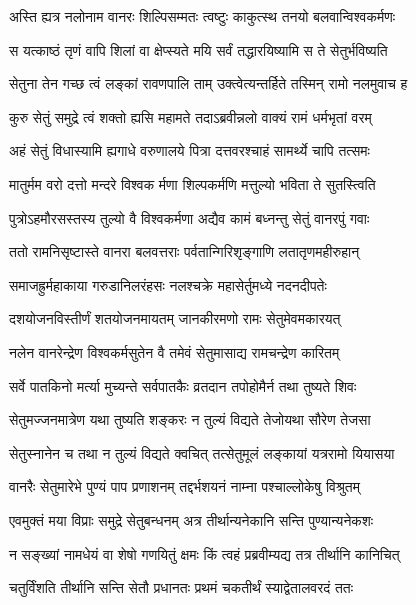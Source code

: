 \twolineshloka
{अस्ति ह्यत्र नलोनाम वानरः शिल्पिसम्मतः}
{त्वष्टुः काकुत्स्थ तनयो बलवान्विश्वकर्मणः}%

\twolineshloka
{स यत्काष्ठं तृणं वापि शिलां वा क्षेप्स्यते मयि}
{सर्वं तद्धारयिष्यामि स ते सेतुर्भविष्यति}%

\twolineshloka
{सेतुना तेन गच्छ त्वं लङ्कां रावणपालि ताम्}
{उक्त्वेत्यन्तर्हिते तस्मिन् रामो नलमुवाच ह}%

\twolineshloka
{कुरु सेतुं समुद्रे त्वं शक्तो ह्यसि महामते}
{तदाऽब्रवीन्नलो वाक्यं रामं धर्मभृतां वरम्}%

\twolineshloka
{अहं सेतुं विधास्यामि ह्यगाधे वरुणालये}
{पित्रा दत्तवरश्चाहं सामर्थ्ये चापि तत्समः}%

\twolineshloka
{मातुर्मम वरो दत्तो मन्दरे विश्वक र्मणा}
{शिल्पकर्मणि मत्तुल्यो भविता ते सुतस्त्विति}%

\twolineshloka
{पुत्रोऽहमौरसस्तस्य तुल्यो वै विश्वकर्मणा}
{अद्यैव कामं बध्नन्तु सेतुं वानरपुं गवाः}%

\twolineshloka
{ततो रामनिसृष्टास्ते वानरा बलवत्तराः}
{पर्वतान्गिरिशृङ्गाणि लतातृणमहीरुहान्}%

\twolineshloka
{समाजह्रुर्महाकाया गरुडानिलरंहसः}
{नलश्चक्रे महासेर्तुमध्ये नदनदीपतेः}%

\twolineshloka
{दशयोजनविस्तीर्णं शतयोजनमायतम्}
{जानकीरमणो रामः सेतुमेवमकारयत्}%

\twolineshloka
{नलेन वानरेन्द्रेण विश्वकर्मसुतेन वै}
{तमेवं सेतुमासाद्य रामचन्द्रेण कारितम्}%

\twolineshloka
{सर्वे पातकिनो मर्त्या मुच्यन्ते सर्वपातकैः}
{व्रतदान तपोहोमैर्न तथा तुष्यते शिवः}%

\twolineshloka
{सेतुमज्जनमात्रेण यथा तुष्यति शङ्करः}
{न तुल्यं विद्यते तेजोयथा सौरेण तेजसा}%

\twolineshloka
{सेतुस्नानेन च तथा न तुल्यं विद्यते क्वचित्}
{तत्सेतुमूलं लङ्कायां यत्ररामो यियासया}%

\twolineshloka
{वानरैः सेतुमारेभे पुण्यं पाप प्रणाशनम्}
{तद्दर्भशयनं नाम्ना पश्चाल्लोकेषु विश्रुतम्}%

\twolineshloka
{एवमुक्तं मया विप्राः समुद्रे सेतुबन्धनम्}
{अत्र तीर्थान्यनेकानि सन्ति पुण्यान्यनेकशः}%

\twolineshloka
{न सङ्ख्यां नामधेयं वा शेषो गणयितुं क्षमः}
{किं त्वहं प्रब्रवीम्यद्य तत्र तीर्थानि कानिचित्}%

\twolineshloka
{चतुर्विंशति तीर्थानि सन्ति सेतौ प्रधानतः}
{प्रथमं चकतीर्थं स्याद्वेतालवरदं ततः}%

